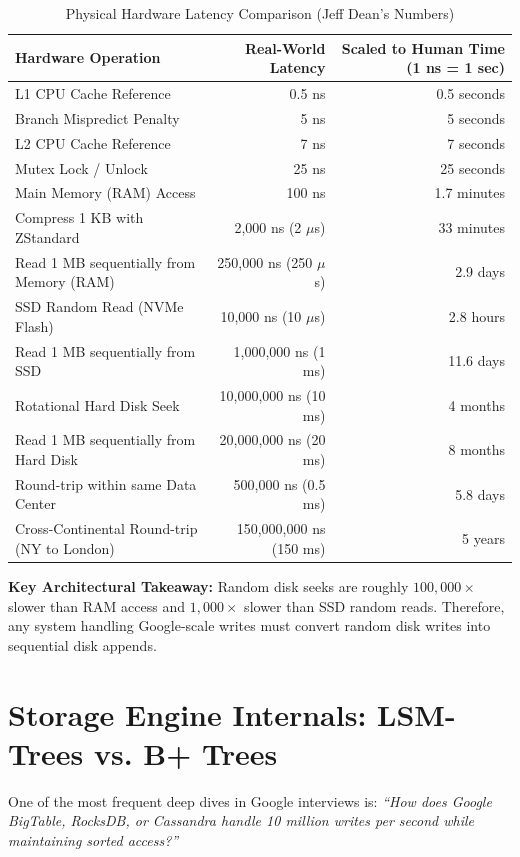 \documentclass[10pt,journal,compsoc,onecolumn]{IEEEtran}
\begin{document}
\begin{table}[htbp]
\caption{Physical Hardware Latency Comparison (Jeff Dean's Numbers)}
\label{tab:latency_numbers}
\centering
\begin{tabular}{lrr}
\toprule
\textbf{Hardware Operation} & \textbf{Real-World Latency} & \textbf{Scaled to Human Time (1 ns = 1 sec)} \\
\midrule
L1 CPU Cache Reference & 0.5 ns & 0.5 seconds \\
Branch Mispredict Penalty & 5 ns & 5 seconds \\
L2 CPU Cache Reference & 7 ns & 7 seconds \\
Mutex Lock / Unlock & 25 ns & 25 seconds \\
Main Memory (RAM) Access & 100 ns & 1.7 minutes \\
Compress 1 KB with ZStandard & 2,000 ns (2 $\mu$s) & 33 minutes \\
Read 1 MB sequentially from Memory (RAM) & 250,000 ns (250 $\mu$s) & 2.9 days \\
SSD Random Read (NVMe Flash) & 10,000 ns (10 $\mu$s) & 2.8 hours \\
Read 1 MB sequentially from SSD & 1,000,000 ns (1 ms) & 11.6 days \\
Rotational Hard Disk Seek & 10,000,000 ns (10 ms) & 4 months \\
Read 1 MB sequentially from Hard Disk & 20,000,000 ns (20 ms) & 8 months \\
Round-trip within same Data Center & 500,000 ns (0.5 ms) & 5.8 days \\
Cross-Continental Round-trip (NY to London) & 150,000,000 ns (150 ms) & 5 years \\
\bottomrule
\end{tabular}
\end{table}

\textbf{Key Architectural Takeaway:} Random disk seeks are roughly $100,000\times$ slower than RAM access and $1,000\times$ slower than SSD random reads. Therefore, any system handling Google-scale writes must convert random disk writes into sequential disk appends.

\section{Storage Engine Internals: LSM-Trees vs. B+ Trees}
\label{sec:lsm_vs_btree}

One of the most frequent deep dives in Google interviews is: \emph{``How does Google BigTable, RocksDB, or Cassandra handle 10 million writes per second while maintaining sorted access?''}
\end{document}
